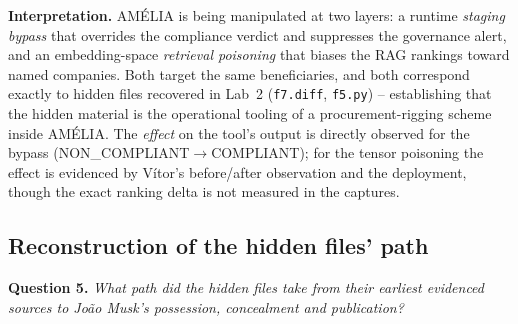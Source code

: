 \documentclass[11pt,a4paper,final,oneside]{article}
\begin{document}
\textbf{Interpretation.} AMÉLIA is being manipulated at two layers: a runtime
\emph{staging bypass} that overrides the compliance verdict and suppresses the
governance alert, and an embedding-space \emph{retrieval poisoning} that biases
the RAG rankings toward named companies. Both target the same beneficiaries, and
both correspond exactly to hidden files recovered in Lab~2 (\texttt{f7.diff},
\texttt{f5.py}) -- establishing that the hidden material is the operational
tooling of a procurement-rigging scheme inside AMÉLIA. The \emph{effect} on the
tool's output is directly observed for the bypass (NON\_COMPLIANT$\rightarrow$COMPLIANT);
for the tensor poisoning the effect is evidenced by Vítor's before/after
observation and the deployment, though the exact ranking delta is not measured in
the captures.

\subsection{Reconstruction of the hidden files' path}
\label{sec:q5}

\textbf{Question 5.} \textit{What path did the hidden files take from their
earliest evidenced sources to João Musk's possession, concealment and
publication?}
\end{document}
